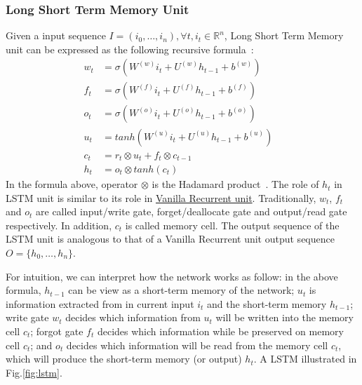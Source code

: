 \subsubsection{Long Short Term Memory Unit}\label{sec:lstm}
Given a input sequence \(I = (i_0,\ldots,i_n), \forall t, i_t \in \mathbb{R}^n\), Long Short Term Memory unit can be expressed as the following recursive formula~\cite{treeLSTM}:
\begin{align}
    w_t &= \sigma(W^{(w)}i_t + U^{(w)}h_{t-1} + b^{(w)}) \label{eq:lstm-input-gate}&\\ 
      f_t &= \sigma(W^{(f)}i_t + U^{(f)}h_{t-1} + b^{(f)}) \label{eq:lstm-forget-gate}&\\ 
      o_t &= \sigma(W^{(o)}i_t + U^{(o)}h_{t-1} + b^{(o)}) \label{eq:lstm-output-gate}&\\ 
      u_t &= tanh(W^{(u)}i_t + U^{(u)}h_{t-1} + b^{(u)}) \label{eq:lstm-update-gate}&\\ 
      c_t &= r_t \otimes u_t + f_t \otimes c_{t-1} \label{eq:longterm-mem}&\\ 
      h_t &= o_t \otimes tanh(c_t) \label{eq:temperal-mem}& 
\end{align}
In the formula above, operator \(\otimes\) is the Hadamard product~\cite{element-prod}.
The role of \(h_t\) in LSTM unit is similar to its role in \hyperref[sec:vanilla-rnn]{Vanilla Recurrent unit}. 
Traditionally, \(w_t\), \(f_t\) and \(o_t\) are called input/write gate, forget/deallocate gate and output/read gate respectively. 
In addition, \(c_t\) is called memory cell. 
The output sequence of the LSTM unit is analogous to that of a Vanilla Recurrent unit output sequence \(O = \{h_0,\ldots,h_n\}\).

For intuition, we can interpret how the network works as follow: in the above formula, \(h_{t-1}\) can be view as a short-term memory of the network; \(u_t\) is information extracted from in current input \(i_t\) and the short-term memory \(h_{t-1}\); write gate \(w_t\) decides which information from \(u_t\) will be written into the memory cell \(c_t\); forgot gate \(f_t\) decides which information while be preserved on memory cell \(c_t\); and \(o_t\) decides which information will be read from the memory cell \(c_t\), which will produce the short-term memory (or output) \(h_t\). 
A LSTM illustrated in Fig.\ref{fig:lstm}.

